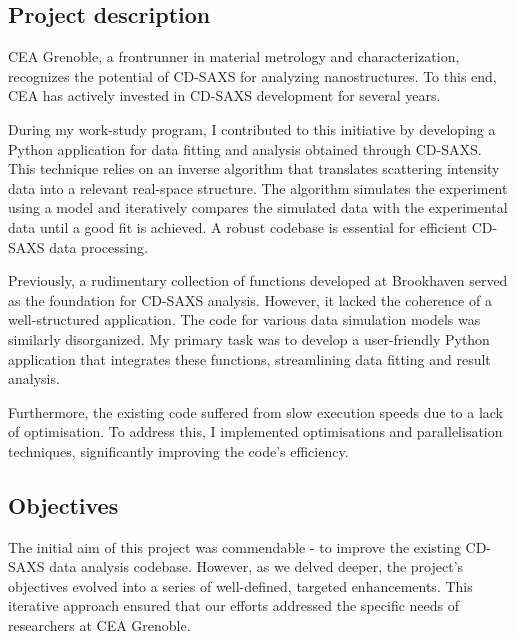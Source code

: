 \medskip

\subsection{Project description}

\medskip
CEA Grenoble, a frontrunner in material metrology and characterization, recognizes the potential
 of CD-SAXS for analyzing nanostructures. To 
 this end, CEA has actively invested in CD-SAXS development for several years.

\medskip

During my work-study program, I contributed to this initiative by developing a Python application
 for data fitting and analysis obtained through CD-SAXS. This technique relies on an inverse 
 algorithm that translates scattering intensity data into a relevant real-space structure. The 
 algorithm simulates the experiment using a model and iteratively compares the simulated data 
 with the experimental data until a good fit is achieved. A robust codebase is essential for 
 efficient CD-SAXS data processing.

\medskip

Previously, a rudimentary collection of functions developed at Brookhaven served as the 
foundation for CD-SAXS analysis. However, it lacked the coherence of a well-structured application.
The code for various data simulation models was similarly disorganized. My primary task was to 
develop a user-friendly Python application that integrates these functions, streamlining data 
fitting and result analysis.

\medskip

Furthermore, the existing code suffered from slow execution speeds due to a lack of optimisation.
To address this, I implemented optimisations and parallelisation techniques, significantly 
improving the code's efficiency.

\medskip


\subsection{Objectives}

\medskip

The initial aim of this project was commendable - to improve the existing CD-SAXS data analysis 
codebase. However, as we delved deeper, the project's objectives evolved into a series of 
well-defined, targeted enhancements. This iterative approach ensured that our efforts addressed 
the specific needs of researchers at CEA Grenoble.

